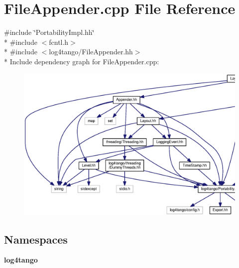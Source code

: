 \section{File\-Appender.\-cpp File Reference}
\label{FileAppender_8cpp}
{\ttfamily \#include \char`\"{}Portability\-Impl.\-hh\char`\"{}}\\*
{\ttfamily \#include $<$fcntl.\-h$>$}\\*
{\ttfamily \#include $<$log4tango/\-File\-Appender.\-hh$>$}\\*
Include dependency graph for File\-Appender.\-cpp\-:
\nopagebreak
\begin{figure}[H]
\begin{center}
\leavevmode
\includegraphics[width=350pt]{dc/db4/FileAppender_8cpp__incl}
\end{center}
\end{figure}
\subsection*{Namespaces}
\begin{DoxyCompactItemize}
\item 
{\bf log4tango}
\end{DoxyCompactItemize}
